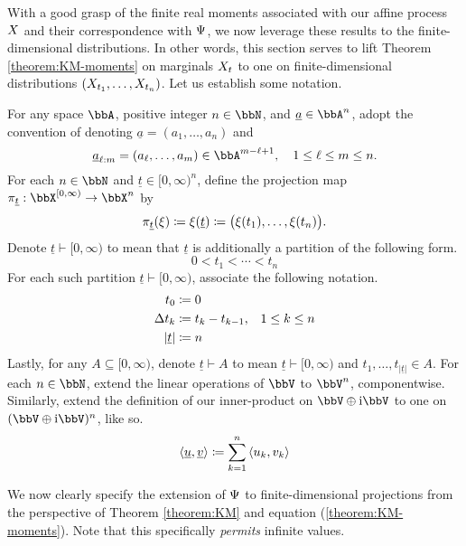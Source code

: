 With a good grasp of the finite real moments associated with our affine process $X$ and their correspondence with $\Psi$, we now leverage these results to the finite-dimensional distributions.
In other words, this section serves to lift Theorem \ref{theorem:KM-moments} on marginals $X_t$ to one on finite-dimensional distributions $(X_{t_1}, \ldots, X_{t_n})$.
Let us establish some notation.

For any space $\bbA$, positive integer $n\in\bbN$, and $\underline a \in \bbA^n$, adopt the convention of denoting $\underline a = (a_1, \ldots, a_n)$ and 
\begin{equation*}
  \underline a_{\ell:m} = (a_\ell,\ldots,a_m) \in \bbA^{m-\ell+1}, \quad 1 \leq \ell \leq m \leq n.
\end{equation*}
For each $n\in \bbN$ and $\underline t \in [0,\infty)^n$, define the projection map $\pi_{\underline t}: \stateSpace^{[0,\infty)} \rightarrow \stateSpace^n$ by
\begin{equation*}
  \pi_{\underline t}(\xi) \coloneqq \xi(\underline t) \coloneqq \big( \xi(t_1), \ldots, \xi(t_n) \big).
\end{equation*}
Denote $\underline t \vdash [0,\infty)$ to mean that $\underline t$ is additionally a partition of the following form.
\begin{equation*}
  0 < t_1 < \cdots < t_n
\end{equation*}
For each such partition $\underline t \vdash [0,\infty)$, associate the following notation.
\begin{align*}
  t_0 &\coloneqq 0 \\
  \Delta t_k &\coloneqq t_k - t_{k-1}, & 1 \leq k \leq n \\
  |\underline t| &\coloneqq n
\end{align*}
Lastly, for any $A \subseteq [0,\infty)$, denote $\underline t \vdash A$ to mean $\underline t \vdash [0,\infty)$ and $t_1,\ldots,t_{|\underline t|} \in A$.
For each $n \in \bbN$, extend the linear operations of $\vecSpace$ to $\vecSpace^n$, componentwise.
Similarly, extend the definition of our inner-product on $\vecSpace \oplus \im\vecSpace$ to one on $(\vecSpace \oplus \im\vecSpace)^n$, like so.
\begin{equation*}
  {\langle \underline{u}, \underline{v}\rangle} \coloneqq \sum_{k=1}^n {\langle u_k , v_k \rangle}
\end{equation*}

We now clearly specify the extension of $\Psi$ to finite-dimensional projections from the perspective of Theorem \ref{theorem:KM} and equation (\ref{theorem:KM-moments}).
Note that this specifically \emph{permits} infinite values.

